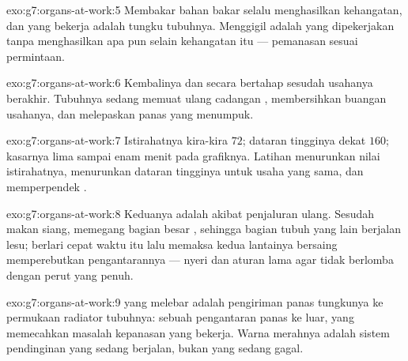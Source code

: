 \begin{solution}{exo:g7:organs-at-work:5}
Membakar bahan bakar selalu menghasilkan kehangatan, dan  yang
bekerja adalah tungku tubuhnya. Menggigil adalah  yang
dipekerjakan tanpa menghasilkan apa pun selain kehangatan itu ---
pemanasan sesuai permintaan.
\end{solution}

\begin{solution}{exo:g7:organs-at-work:6}
Kembalinya  dan  secara bertahap sesudah usahanya
berakhir. Tubuhnya sedang memuat ulang cadangan ,
membersihkan buangan usahanya, dan melepaskan panas yang menumpuk.
\end{solution}

\begin{solution}{exo:g7:organs-at-work:7}
Istirahatnya kira-kira $72$; dataran tingginya dekat $160$;
 kasarnya lima sampai enam menit pada grafiknya. Latihan
menurunkan nilai istirahatnya, menurunkan dataran tingginya untuk
usaha yang sama, dan memperpendek .
\end{solution}

\begin{solution}{exo:g7:organs-at-work:8}
Keduanya adalah akibat penjaluran ulang. Sesudah makan siang,  memegang bagian besar , sehingga bagian tubuh
yang lain berjalan lesu; berlari cepat waktu itu lalu memaksa kedua
lantainya bersaing memperebutkan pengantarannya --- nyeri 
dan aturan lama agar tidak berlomba dengan perut yang penuh.
\end{solution}

\begin{solution}{exo:g7:organs-at-work:9}
  yang melebar adalah pengiriman panas tungkunya ke
permukaan radiator tubuhnya: sebuah pengantaran panas ke luar, yang
memecahkan masalah kepanasan  yang bekerja. Warna merahnya adalah
sistem pendinginan yang sedang berjalan, bukan yang sedang gagal.
\end{solution}

